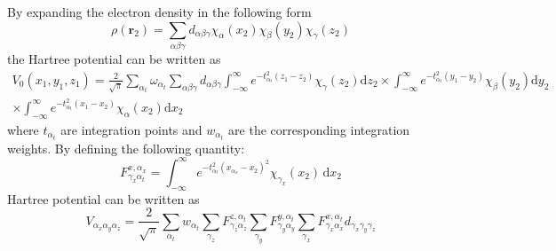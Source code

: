 By expanding the electron density in the following form
\begin{equation}
\rho(\mathbf{r}_2) = \sum_{\alpha\beta\gamma} d_{\alpha\beta\gamma}
\chi_{\alpha}(x_2) \chi_{\beta}(y_2) \chi_{\gamma}(z_2)
\end{equation}
the Hartree potential can be written as
\begin{multline}
V_{0}(x_{1},y_{1},z_{1}) = \frac{2}{\sqrt{\pi}}\sum_{\alpha_t} \omega_{\alpha_t}
\sum_{\alpha\beta\gamma} d_{\alpha\beta\gamma}
\int_{-\infty}^{\infty} e^{-t^2_{\alpha_t}(z_{1} - z_{2}) } \chi_{\gamma}(z_2)\mathrm{d}z_2
\times \int_{-\infty}^{\infty} e^{-t^2_{\alpha_t}(y_{1} - y_{2}) } \chi_{\beta}(y_2)\mathrm{d}y_2 \\
\times \int_{-\infty}^{\infty} e^{-t^2_{\alpha_t}(x_{1} - x_{2}) } \chi_{\alpha}(x_2)\mathrm{d}x_2
\end{multline}
where
$t_{\alpha_t}$ are integration points and $w_{\alpha_t}$ are the corresponding
integration weights.
By defining the following quantity:
\begin{equation}
F_{\gamma_x \alpha_t}^{x,\alpha_x} = \int_{-\infty}^{\infty}
e^{-t^2_{\alpha_t} (x_{\alpha_x} - x_2)^2} \chi_{\gamma_x}(x_2)\,\mathrm{d}x_2
\end{equation}
Hartree potential can be written as
\begin{equation}
V_{\alpha_x \alpha_y \alpha_z} = \frac{2}{\sqrt{\pi}} \sum_{\alpha_t} w_{\alpha_t}
\sum_{\gamma_z} F_{\gamma_z \alpha_z}^{z,\alpha_t}
\sum_{\gamma_y} F_{\gamma_y \alpha_y}^{y,\alpha_t}
\sum_{\gamma_x} F_{\gamma_x \alpha_x}^{x,\alpha_t}
d_{\gamma_x \gamma_y \gamma_z}
\end{equation}


